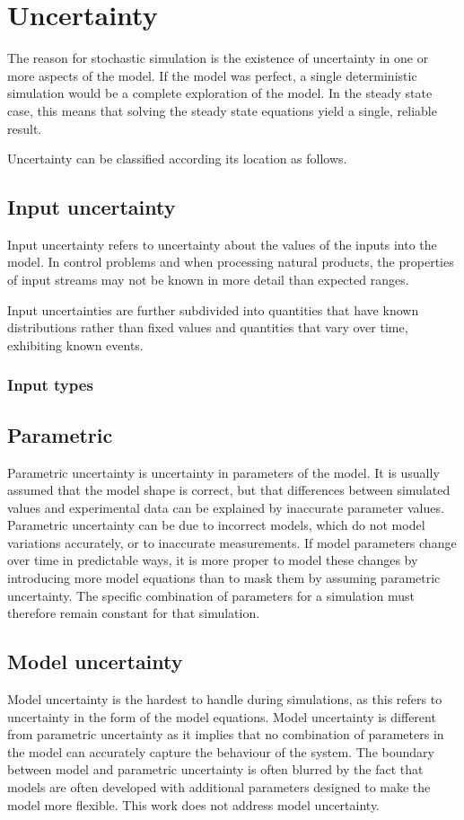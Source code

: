 \section{Uncertainty}
The reason for stochastic simulation is the existence of uncertainty in one or more aspects of the model.  
If the model was perfect, a single deterministic simulation would be a complete exploration of the model.  
In the steady state case, this means that solving the steady state equations yield a single, reliable result.  

Uncertainty can be classified according its location as follows.

\subsection{Input uncertainty}
Input uncertainty refers to uncertainty about the values of the inputs into the model.  
In control problems and when processing natural products, the properties of input streams may not be known in more detail than expected ranges.

Input uncertainties are further subdivided into quantities that have known distributions rather than fixed values and quantities that vary over time, exhibiting known events.

\subsubsection{Input types}

\subsection{Parametric}
Parametric uncertainty is uncertainty in parameters of the model.  
It is usually assumed that the model shape is correct, but that differences between simulated values and experimental data can be explained by inaccurate parameter values.  
Parametric uncertainty can be due to incorrect models, which do not model variations accurately, or to inaccurate measurements.  
If model parameters change over time in predictable ways, it is more proper to model these changes by introducing more model equations than to mask them by assuming parametric uncertainty.  
The specific combination of parameters for a simulation must therefore remain constant for that simulation.

\subsection{Model uncertainty}
Model uncertainty is the hardest to handle during simulations, as this refers to uncertainty in the form of the model equations.  
Model uncertainty is different from parametric uncertainty as it implies that no combination of parameters in the model can accurately capture the behaviour of the system.  
The boundary between model and parametric uncertainty is often blurred by the fact that models are often developed with additional parameters designed to make the model more flexible.  
This work does not address model uncertainty.

